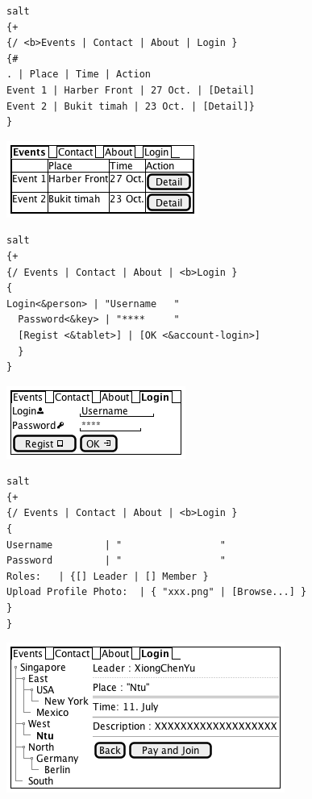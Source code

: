 \documentclass[11pt]{article}
\author{XIONG CHENYU}
\date{\today}
\title{}
\begin{document}
\tableofcontents

\begin{verbatim}
salt
{+
{/ <b>Events | Contact | About | Login }
{#
. | Place | Time | Action
Event 1 | Harber Front | 27 Oct. | [Detail]
Event 2 | Bukit timah | 23 Oct. | [Detail]}
}
\end{verbatim}

\begin{center}
\includegraphics[width=.9\linewidth]{home.png}
\end{center}

\begin{verbatim}
salt
{+
{/ Events | Contact | About | <b>Login }
{
Login<&person> | "Username   "
  Password<&key> | "****     "
  [Regist <&tablet>] | [OK <&account-login>]
  }
}
\end{verbatim}

\begin{center}
\includegraphics[width=.9\linewidth]{login.png}
\end{center}

\begin{verbatim}
salt
{+
{/ Events | Contact | About | <b>Login }
{
Username         | "                 "
Password         | "                 "
Roles:   | {[] Leader | [] Member }
Upload Profile Photo:  | { "xxx.png" | [Browse...] }
}
}
\end{verbatim}

\begin{center}
\includegraphics[width=.9\linewidth]{regist.png}
\end{center}
\end{document}
